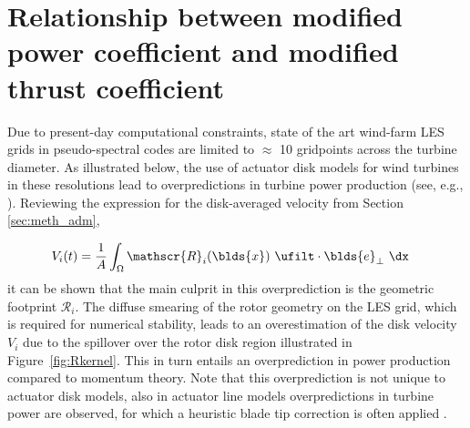 \chapter{Relationship between modified power coefficient and modified thrust coefficient}\label{ch:app_adm}

Due to present-day computational constraints, state of the art wind-farm LES grids in pseudo-spectral codes are limited to $\approx$ 10 gridpoints across the turbine diameter. As illustrated below, the use of actuator disk models for wind turbines in these resolutions lead to overpredictions in turbine power production (see, e.g., \citealp{martinez2016wind, martinez2015large}). Reviewing the expression for the disk-averaged velocity from Section \ref{sec:meth_adm}, 

\begin{align}
V_i(t) &= \frac{1}{A} \int_{\Omega} \mathscr{R}_i(\blds{x})~\ufilt \cdot \blds{e}_\perp~\dx
\end{align}
it can be shown that the main culprit in this overprediction is the geometric footprint $\mathscr{R}_i$. The diffuse smearing of the rotor geometry on the LES grid, which is required for numerical stability, leads to an overestimation of the disk velocity $V_{i}$ due to the spillover over the rotor disk region illustrated in Figure~\ref{fig:Rkernel}. This in turn entails an overprediction in power production compared to momentum theory. Note that this overprediction is not unique to actuator disk models, also in actuator line models overpredictions in turbine power are observed, for which a heuristic blade tip correction is often applied \citep{martinez2016wind}.


